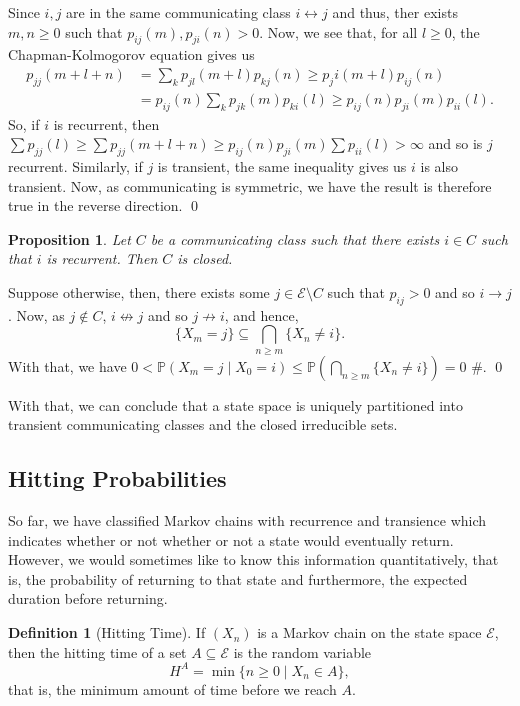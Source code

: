 \documentclass[
]{article}
\newtheorem{prop}{Proposition}[theorem]
\theoremstyle{definition}
\newtheorem{definition}{Definition}[section]
\begin{document}
Since \(i, j\) are in the same communicating class
\(i \leftrightarrow j\) and thus, ther exists \(m, n \ge 0\) such that
\(p_{ij}(m), p_{ji}(n) > 0\). Now, we see that, for all \(l \ge 0\), the
Chapman-Kolmogorov equation gives us \begin{align*}
    p_{jj}(m + l + n) & = \sum_k p_{jl}(m + l) p_{kj}(n)
      \ge p_ji(m + l)p_{ij}(n)\\
      & = p_{ij}(n) \sum_k p_{jk}(m)p_{ki}(l)
      \ge p_{ij}(n) p_{ji}(m) p_{ii}(l).
  \end{align*} So, if \(i\) is recurrent, then
\(\sum p_{jj}(l) \ge \sum p_{jj}(m + l + n)  \ge p_{ij}(n) p_{ji}(m) \sum p_{ii}(l) > \infty\)
and so is \(j\) recurrent. Similarly, if \(j\) is transient, the same
inequality gives us \(i\) is also transient. Now, as communicating is
symmetric, we have the result is therefore true in the reverse
direction. \qed

\begin{prop}
  Let \(C\) be a communicating class such that there exists \(i \in C\) such 
  that \(i\) is recurrent. Then \(C\) is closed. 
\end{prop}
\proof

Suppose otherwise, then, there exists some
\(j \in \mathcal{E} \setminus C\) such that \(p_{ij} > 0\) and so
\(i \to j\). Now, as \(j \not\in C\), \(i \not\leftrightarrow j\) and so
\(j \not\to i\), and hence,
\[\{X_m = j\} \subseteq \bigcap_{n \ge m} \{X_n \neq i\}.\] With that,
we have
\(0 < \mathbb{P}(X_m = j \mid X_0 = i) \le \mathbb{P}  (\bigcap_{n \ge m} \{X_n \neq i\}) = 0\)
\#. \qed

With that, we can conclude that a state space is uniquely partitioned
into transient communicating classes and the closed irreducible sets.

\hypertarget{hitting-probabilities}{%
\subsection{Hitting Probabilities}\label{hitting-probabilities}}

So far, we have classified Markov chains with recurrence and transience
which indicates whether or not whether or not a state would eventually
return. However, we would sometimes like to know this information
quantitatively, that is, the probability of returning to that state and
furthermore, the expected duration before returning.

\begin{definition}[Hitting Time]
  If \((X_n)\) is a Markov chain on the state space \(\mathcal{E}\), then the 
  hitting time of a set \(A \subseteq \mathcal{E}\) is the random variable 
  \[H^A = \min \{n \ge 0 \mid X_n \in A\},\]
  that is, the minimum amount of time before we reach \(A\). 
\end{definition}
\end{document}

